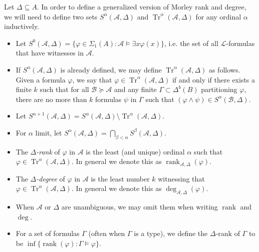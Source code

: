 \documentclass{article}
\DeclareMathOperator{\Tr}{Tr}
\DeclareMathOperator{\rank}{rank}
\let\mc\mathcal
\begin{document}
\begin{definition}
    Let $\Delta \subseteq A$. In order to define a generalized version of Morley rank and degree, we will need to define two sets $S^{\alpha}(\mc{A}, \Delta)$ and $\Tr^{\alpha}(\mc{A}, \Delta)$ for any ordinal $\alpha$ inductively.
    \begin{itemize}
        \item Let $S^{0}(\mc{A}, \Delta) = \{ \varphi \in \Sigma_1(A) : \mc{A} \vDash \exists x \varphi(x) \}$, i.e. the set of all $\mc{L}$-formulas that have witnesses in $\mc{A}$.

        \item If $S^{\alpha}(\mc{A}, \Delta)$ is already defined, we may define $\Tr^{\alpha}(\mc{A}, \Delta)$ as follows. Given a formula $\varphi$, we say that $\varphi \in \Tr^{\alpha}(\mc{A}, \Delta)$ if and only if there exists a finite $k$ such that for all $\mc{B} \succeq \mc{A}$ and any finite $\Gamma \subset \Delta^{b}(B)$ partitioning $\varphi$, there are no more than $k$ formulas $\psi$ in $\Gamma$ such that $(\varphi \land \psi) \in S^{\alpha}(\mc{B}, \Delta)$.
        
        \item Let $S^{\alpha+1}(\mc{A}, \Delta) = S^{\alpha}(\mc{A}, \Delta) \setminus \Tr^{\alpha}(\mc{A}, \Delta)$.

        \item For $\alpha$ limit, let $S^{\alpha}(\mc{A}, \Delta) = \bigcap_{\beta < \alpha} S^{\beta}(\mc{A}, \Delta)$.

        \item The \textit{$\Delta$-rank} of $\varphi$ in $\mc{A}$ is the least (and unique) ordinal $\alpha$ such that $\varphi \in \Tr^{\alpha}(\mc{A}, \Delta)$. In general we denote this as $\rank_{\mc{A}, \Delta}(\varphi)$.
        
        \item The \textit{$\Delta$-degree} of $\varphi$ in $\mc{A}$ is the least number $k$ witnessing that $\varphi \in \Tr^{\alpha}(\mc{A}, \Delta)$. In general we denote this as $\deg_{\mc{A}, \Delta}(\varphi)$.
        
        \item When $\mc{A}$ or $\Delta$ are unambiguous, we may omit them when writing $\rank$ and $\deg$.
        
        \item For a set of formulas $\Gamma$ (often when $\Gamma$ is a type), we define the $\Delta$-rank of $\Gamma$ to be $\inf \{ \rank(\varphi) : \Gamma \vDash \varphi \}$.
    \end{itemize}
\end{definition}
\end{document}
